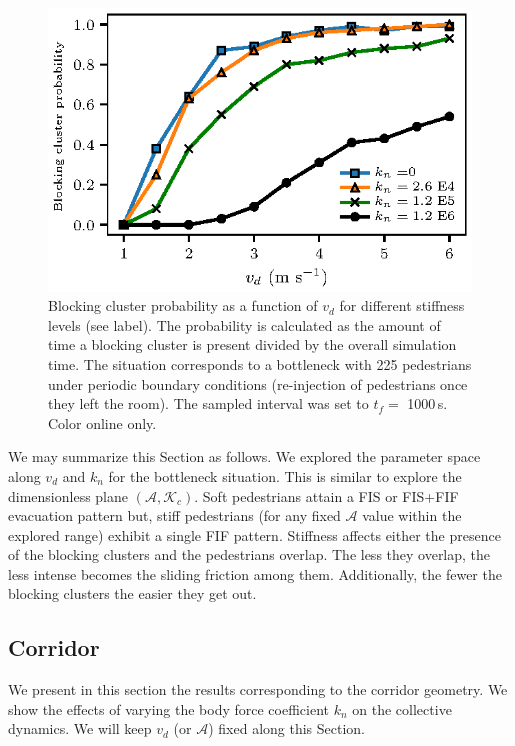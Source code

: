 \documentclass[preprint,12pt]{elsarticle}
\begin{document}
\begin{figure}[htbp!]
\centering
\includegraphics[width=0.7\columnwidth]
{./pbc_vs_vd_multi_kn.eps}
\caption{\label{pbc_vs_vd_multi_kn} Blocking cluster probability as a function 
of $v_d$ for different stiffness levels (see label). The probability is 
calculated as the amount of time a blocking cluster is present divided by the 
overall simulation time. The situation corresponds to a bottleneck with 225 
pedestrians under periodic boundary conditions (re-injection of pedestrians once
 they left the room). The sampled interval was set to $t_f =$ 1000$\,$s. 
 Color online only. }
\end{figure}

We may summarize this Section as follows. We explored the parameter space along
$v_d$ and $k_n$ for the bottleneck situation. This is similar to explore the
dimensionless plane $(\mathcal{A},\mathcal{K}_c)$. Soft pedestrians attain a FIS
or FIS+FIF evacuation pattern but, stiff pedestrians (for any fixed
$\mathcal{A}$ value within the explored range) exhibit a single FIF pattern.
Stiffness affects either the presence of the blocking clusters and the
pedestrians overlap. The less they overlap, the less intense becomes the sliding
friction among them. Additionally, the fewer the blocking clusters the easier
they get out. \\



\subsection{\label{corridor} Corridor}

We present in this section the results corresponding to the corridor geometry.
We show the effects of varying the body force coefficient $k_n$ on the
collective dynamics. We will keep $v_d$ (or $\mathcal{A}$)  fixed along this
Section. \\
\end{document}

